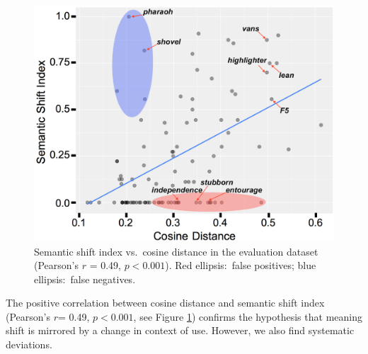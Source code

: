 

\begin{figure}[t]\centering
\includegraphics[width=\columnwidth]{images/cosine_distance_shift_index_annotated_4.png}
\caption{Semantic shift index vs.~cosine distance in the evaluation dataset (Pearson's $r$ = 0.49, $p< 0.001$). 
Red ellipsis:~false positives; blue ellipsis:~false negatives.
\label{fig:shift-cosine}}
\end{figure}

The positive correlation between cosine distance and semantic shift index (Pearson's $r$= 0.49, $p<0.001$, see Figure \ref{fig:shift-cosine}) confirms the hypothesis that meaning shift is mirrored by a change in context of use. However, we also find systematic deviations. 

